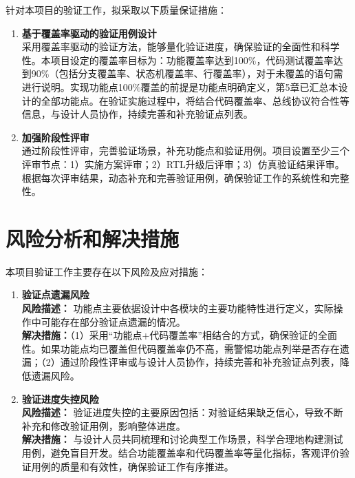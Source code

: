 \documentclass[fontset=windows]{article}
\begin{document}
针对本项目的验证工作，拟采取以下质量保证措施：

\begin{enumerate}[label=(\arabic*)]
    \item \textbf{基于覆盖率驱动的验证用例设计} \\
    采用覆盖率驱动的验证方法，能够量化验证进度，确保验证的全面性和科学性。本项目设定的覆盖率目标为：功能覆盖率达到100\%，代码测试覆盖率达到90\%（包括分支覆盖率、状态机覆盖率、行覆盖率），对于未覆盖的语句需进行说明。实现功能点100\%覆盖的前提是功能点明确定义，第5章已汇总本设计的全部功能点。在验证实施过程中，将结合代码覆盖率、总线协议符合性等信息，与设计人员协作，持续完善和补充验证点列表。
    \item \textbf{加强阶段性评审} \\
    通过阶段性评审，完善验证场景，补充功能点和验证用例。项目设置至少三个评审节点：1）实施方案评审；2）RTL升级后评审；3）仿真验证结果评审。根据每次评审结果，动态补充和完善验证用例，确保验证工作的系统性和完整性。
\end{enumerate}

\section{风险分析和解决措施}

本项目验证工作主要存在以下风险及应对措施：

\begin{enumerate}[label=(\arabic*)]
    \item \textbf{验证点遗漏风险} \\
    \textbf{风险描述：} 功能点主要依据设计中各模块的主要功能特性进行定义，实际操作中可能存在部分验证点遗漏的情况。\\
    \textbf{解决措施：}（1）采用“功能点+代码覆盖率”相结合的方式，确保验证的全面性。如果功能点均已覆盖但代码覆盖率仍不高，需警惕功能点列举是否存在遗漏；（2）通过阶段性评审或与设计人员协作，持续完善和补充验证点列表，降低遗漏风险。
    \item \textbf{验证进度失控风险} \\
    \textbf{风险描述：} 验证进度失控的主要原因包括：对验证结果缺乏信心，导致不断补充和修改验证用例，影响整体进度。\\
    \textbf{解决措施：} 与设计人员共同梳理和讨论典型工作场景，科学合理地构建测试用例，避免盲目开发。结合功能覆盖率和代码覆盖率等量化指标，客观评价验证用例的质量和有效性，确保验证工作有序推进。
\end{enumerate}


\end{document}
